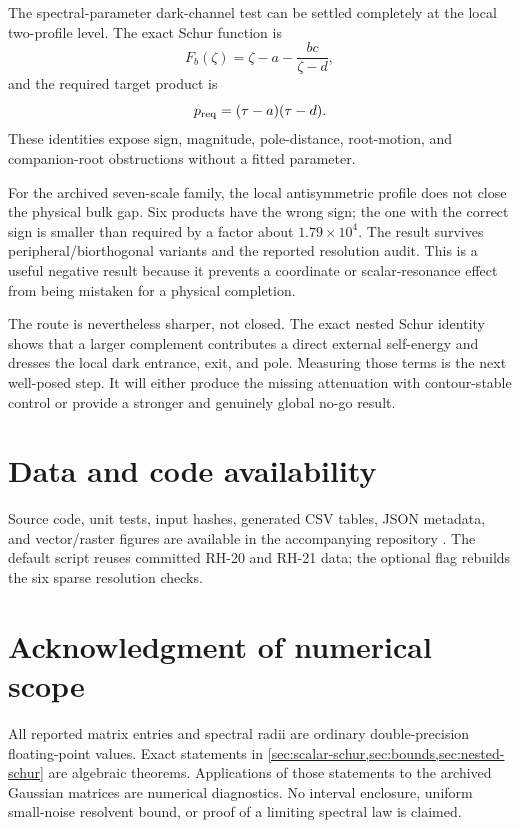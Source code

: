 \documentclass[11pt]{article}
\theoremstyle{definition}
\theoremstyle{remark}
\begin{document}
The spectral-parameter dark-channel test can be settled completely at the
local two-profile level.  The exact Schur function is
\begin{equation}\label{eq:conclusion-schur}
 F_b(\zeta)=\zeta-a-\frac{bc}{\zeta-d},
\end{equation}
and the required target product is
\begin{equation}\label{eq:conclusion-target}
 p_{\rm req}=(\tau-a)(\tau-d).
\end{equation}
These identities expose sign, magnitude, pole-distance, root-motion, and
companion-root obstructions without a fitted parameter.

For the archived seven-scale family, the local antisymmetric profile does
not close the physical bulk gap.  Six products have the wrong sign; the one
with the correct sign is smaller than required by a factor about $1.79
\times10^4$.  The result survives peripheral/biorthogonal variants and the
reported resolution audit.  This is a useful negative result because it
prevents a coordinate or scalar-resonance effect from being mistaken for a
physical completion.

The route is nevertheless sharper, not closed.  The exact nested Schur
identity shows that a larger complement contributes a direct external
self-energy and dresses the local dark entrance, exit, and pole.  Measuring
those terms is the next well-posed step.  It will either produce the missing
attenuation with contour-stable control or provide a stronger and genuinely
global no-go result.

\section*{Data and code availability}

Source code, unit tests, input hashes, generated CSV tables, JSON metadata,
and vector/raster figures are available in the accompanying repository
\citep{WangDarkSchurCode2026}.  The default script reuses committed RH-20 and
RH-21 data; the optional flag rebuilds the six sparse resolution checks.

\section*{Acknowledgment of numerical scope}

All reported matrix entries and spectral radii are ordinary double-precision
floating-point values.  Exact statements in
\cref{sec:scalar-schur,sec:bounds,sec:nested-schur} are algebraic theorems.
Applications of those statements to the archived Gaussian matrices are
numerical diagnostics.  No interval enclosure, uniform small-noise
resolvent bound, or proof of a limiting spectral law is claimed.



\end{document}
